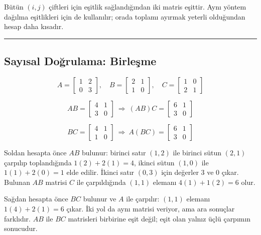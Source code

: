 \documentclass[
  letterpaper,
  DIV=11,
  numbers=noendperiod]{scrartcl}
\begin{document}
Bütün \((i,j)\) çiftleri için eşitlik sağlandığından iki matris eşittir.
Aynı yöntem dağılma eşitlikleri için de kullanılır; orada toplamı
ayırmak yeterli olduğundan hesap daha kısadır.

\begin{center}\rule{0.5\linewidth}{0.5pt}\end{center}

\subsection{Sayısal Doğrulama:
Birleşme}\label{sayux131sal-doux11frulama-birleux15fme}

\[
A=\begin{bmatrix}1&2\\0&3\end{bmatrix},
\quad
B=\begin{bmatrix}2&1\\1&0\end{bmatrix},
\quad
C=\begin{bmatrix}1&0\\2&1\end{bmatrix}
\]

\[
AB=\begin{bmatrix}4&1\\3&0\end{bmatrix}
\ \Longrightarrow\
(AB)C=\begin{bmatrix}6&1\\3&0\end{bmatrix}
\]

\[
BC=\begin{bmatrix}4&1\\1&0\end{bmatrix}
\ \Longrightarrow\
A(BC)=\begin{bmatrix}6&1\\3&0\end{bmatrix}
\]

Soldan hesapta önce \(AB\) bulunur: birinci satır \((1,2)\) ile birinci
sütun \((2,1)\) çarpılıp toplandığında \(1(2)+2(1)=4\), ikinci sütun
\((1,0)\) ile \(1(1)+2(0)=1\) elde edilir. İkinci satır \((0,3)\) için
değerler \(3\) ve \(0\) çıkar. Bulunan \(AB\) matrisi \(C\) ile
çarpıldığında \((1,1)\) elemanı \(4(1)+1(2)=6\) olur.

Sağdan hesapta önce \(BC\) bulunur ve \(A\) ile çarpılır: \((1,1)\)
elemanı \(1(4)+2(1)=6\) çıkar. İki yol da aynı matrisi veriyor, ama ara
sonuçlar farklıdır. \(AB\) ile \(BC\) matrisleri birbirine eşit değil;
eşit olan yalnız üçlü çarpımın sonucudur.
\end{document}
